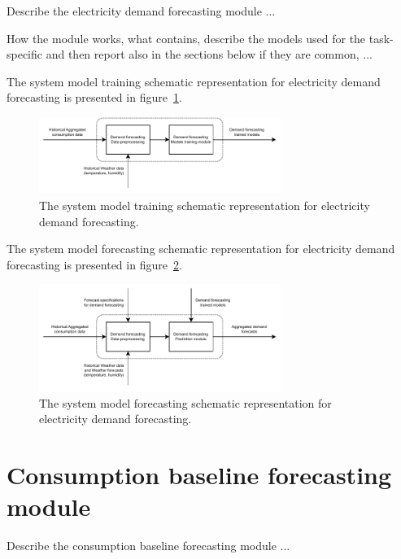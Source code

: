 Describe the electricity demand forecasting module ...

How the module works, what contains, describe the models used for the task-specific and then report also in the sections below if they are common, ...

The system model training schematic representation for electricity demand forecasting is presented in figure~\ref{fig:modeltrainingdemand}.


\begin{figure}[H]
\centering
\includegraphics[width=0.7\textwidth]{images/system_model_training_demand}
\caption{The system model training schematic representation for electricity demand forecasting.}
\label{fig:modeltrainingdemand}
\end{figure}

The system model forecasting schematic representation for electricity demand forecasting is presented in figure~\ref{fig:modelforecastingdemand}.

\begin{figure}[H]
\centering
\includegraphics[width=0.7\textwidth]{images/system_model_forecasting_demand}
\caption{The system model forecasting schematic representation for electricity demand forecasting.}
\label{fig:modelforecastingdemand}
\end{figure}


\section{Consumption baseline forecasting module}
\label{sec:baselinemodel}
\vspace{0.2 cm}

Describe the consumption baseline forecasting module ...

